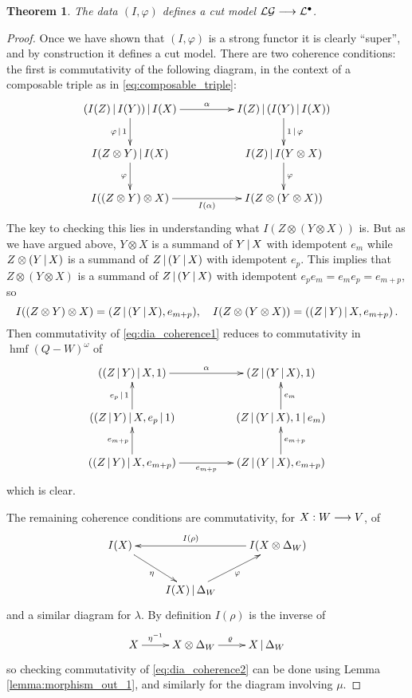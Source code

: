 \documentclass[english,letter paper,12pt,leqno]{article}
\newtheorem{theorem}{Theorem}[section]
\theoremstyle{example}
\numberwithin{equation}{section}
\def\LG{\mathcal{LG}}
\DeclareMathOperator{\hmf}{hmf}
\begin{document}
\begin{theorem} The data $(I, \varphi)$ defines a cut model $\LG \lto \cat{L}^\bullet$.
\end{theorem}
\begin{proof}
Once we have shown that $(I, \varphi)$ is a strong functor it is clearly ``super'', and by construction it defines a cut model. There are two coherence conditions: the first is commutativity of the following diagram, in the context of a composable triple as in \eqref{eq:composable_triple}:
\begin{equation}\label{eq:dia_coherence1}
\xymatrix@C+2pc{
(I(Z) \l I(Y) ) \l I(X) \ar[r]^-{\alpha} \ar[d]_-{\varphi \l 1} & I(Z) \l ( I(Y) \l I(X) ) \ar[d]^-{1 \l \varphi} \\
I(Z \otimes Y) \l I(X) \ar[d]_-{\varphi} &  I(Z) \l I(Y \otimes X)\ar[d]^-{\varphi}\\
I( (Z \otimes Y) \otimes X ) \ar[r]_-{I(\alpha)} & I(Z \otimes (Y \otimes X))
}
\end{equation}
The key to checking this lies in understanding what $I( Z \otimes (Y \otimes X) )$ is. But as we have argued above, $Y \otimes X$ is a summand of $Y \,|\, X$ with idempotent $e_m$ while $Z \otimes ( Y \,|\, X )$ is a summand of $Z \,|\, (Y \,|\, X)$ with idempotent $e_p$. This implies that $Z \otimes (Y \otimes X)$ is a summand of $Z \,|\, (Y \,|\, X)$ with idempotent $e_p e_m = e_m e_p = e_{m+p}$, so
\[
I( (Z \otimes Y) \otimes X ) = ( Z \,|\, (Y \,|\, X), e_{m+p} ), \quad I( Z \otimes (Y \otimes X) ) = ( (Z \,|\, Y) \,|\, X, e_{m+p} )\,.
\]
Then commutativity of \eqref{eq:dia_coherence1} reduces to commutativity in $\hmf(Q - W)^{\omega}$ of
\[
\xymatrix@C+2pc{
( (Z \l Y ) \l X, 1 ) \ar[r]^-{\alpha} & ( Z \l (Y \l X ), 1)\\
( (Z \l Y) \l X, e_p \l 1) \ar[u]^-{e_p \l 1} & ( Z \l (Y \l X), 1 \l e_m) \ar[u]_-{e_m}\\
( (Z \l Y) \l X, e_{m+p} ) \ar[u]^-{e_{m+p}} \ar[r]_-{e_{m+p}} & ( Z \l (Y \l X), e_{m+p} ) \ar[u]_-{e_{m+p}}
}
\]
which is clear.

The remaining coherence conditions are commutativity, for $X: W \longrightarrow V$, of
\begin{equation}\label{eq:dia_coherence2}
\xymatrix{
I(X) \ar[dr]_-{\eta} & & I( X \otimes \Delta_W ) \ar[ll]_-{I(\rho)} \\
& I(X) \l \Delta_W \ar[ur]_-{\varphi}
}
\end{equation}
and a similar diagram for $\lambda$. By definition $I(\rho)$ is the inverse of
\[
\xymatrix{
X \ar[r]^-{\eta^{-1}} & X \otimes \Delta_W \ar[r]^{\varrho} & X \l \Delta_W
}
\]
so checking commutativity of \eqref{eq:dia_coherence2} can be done using Lemma \ref{lemma:morphism_out_1}, and similarly for the diagram involving $\mu$.
\end{proof}
\end{document}
